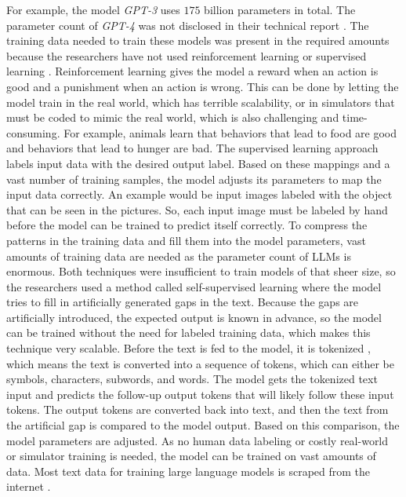 \documentclass[draft,final]{thesisclass} %
\begin{document}
For example, the model \textit{GPT-3} uses $175$ billion parameters \parencite[1]{gpt3} in total. The parameter count of \textit{GPT-4} was not disclosed in their technical report \parencite{gpt4}.
The training data needed to train these models was present in the required amounts because the researchers have not used reinforcement learning \parencite{rl_bible} or supervised learning \parencite[3]{sl_bible}.
Reinforcement learning gives the model a reward when an action is good and a punishment when an action is wrong. This can be done by letting the model train in the real world, which has terrible scalability, or in simulators that must be coded to mimic the real world, which is also challenging and time-consuming.
For example, animals learn that behaviors that lead to food are good and behaviors that lead to hunger are bad.
The supervised learning approach labels input data with the desired output label. Based on these mappings and a vast number of training samples, the model adjusts its parameters to map the input data correctly.
An example would be input images labeled with the object that can be seen in the pictures. So, each input image must be labeled by hand before the model can be trained to predict itself correctly.
To compress the patterns in the training data and fill them into the model parameters, vast amounts of training data are needed as the parameter count of \gls{LLM}s is enormous.
Both techniques were insufficient to train models of that sheer size, so the researchers used a method called self-supervised learning \parencite[7]{llm_literature_review} where the model tries to fill in artificially generated gaps in the text.
Because the gaps are artificially introduced, the expected output is known in advance, so the model can be trained without the need for labeled training data, which makes this technique very scalable.
Before the text is fed to the model, it is tokenized \parencite[4]{llm_literature_review}, which means the text is converted into a sequence of tokens, which can either be symbols, characters, subwords, and words.
The model gets the tokenized text input and predicts the follow-up output tokens that will likely follow these input tokens. The output tokens are converted back into text, and then the text from the artificial gap is compared to the model output.
Based on this comparison, the model parameters are adjusted. As no human data labeling or costly real-world or simulator training is needed, the model can be trained on vast amounts of data.
Most text data for training large language models is scraped from the internet \parencite[1]{llm_literature_review}.
\end{document}

